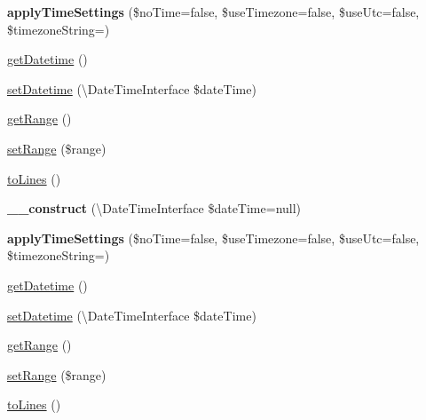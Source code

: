 \begin{DoxyCompactItemize}
{\bfseries apply\+Time\+Settings} (\$no\+Time=false, \$use\+Timezone=false, \$use\+Utc=false, \$timezone\+String=\textquotesingle{}\textquotesingle{})
\item 
\mbox{\hyperlink{class_eluceo_1_1i_cal_1_1_property_1_1_event_1_1_recurrence_id_a343360d2494fc6886739593da7867873}{get\+Datetime}} ()
\item 
\mbox{\hyperlink{class_eluceo_1_1i_cal_1_1_property_1_1_event_1_1_recurrence_id_a348cc32d3b8f03cac585f6eb19ee930f}{set\+Datetime}} (\textbackslash{}Date\+Time\+Interface \$date\+Time)
\item 
\mbox{\hyperlink{class_eluceo_1_1i_cal_1_1_property_1_1_event_1_1_recurrence_id_a7f52a0dbb43dcf28fd95a2b1ad386838}{get\+Range}} ()
\item 
\mbox{\hyperlink{class_eluceo_1_1i_cal_1_1_property_1_1_event_1_1_recurrence_id_ae005792e47bec89df30f5db6cb6ab63c}{set\+Range}} (\$range)
\item 
\mbox{\hyperlink{class_eluceo_1_1i_cal_1_1_property_1_1_event_1_1_recurrence_id_ad7bfce37171e9017a413052603b30ca4}{to\+Lines}} ()
\item 
\mbox{\label{class_eluceo_1_1i_cal_1_1_property_1_1_event_1_1_recurrence_id_a30335a89e4b7cdbb5be84a73340542c3}} 
{\bfseries \+\_\+\+\_\+construct} (\textbackslash{}Date\+Time\+Interface \$date\+Time=null)
\item 
\mbox{\label{class_eluceo_1_1i_cal_1_1_property_1_1_event_1_1_recurrence_id_a7c8a81a7760136bce2ff1b93e2b4d541}} 
{\bfseries apply\+Time\+Settings} (\$no\+Time=false, \$use\+Timezone=false, \$use\+Utc=false, \$timezone\+String=\textquotesingle{}\textquotesingle{})
\item 
\mbox{\hyperlink{class_eluceo_1_1i_cal_1_1_property_1_1_event_1_1_recurrence_id_a343360d2494fc6886739593da7867873}{get\+Datetime}} ()
\item 
\mbox{\hyperlink{class_eluceo_1_1i_cal_1_1_property_1_1_event_1_1_recurrence_id_a348cc32d3b8f03cac585f6eb19ee930f}{set\+Datetime}} (\textbackslash{}Date\+Time\+Interface \$date\+Time)
\item 
\mbox{\hyperlink{class_eluceo_1_1i_cal_1_1_property_1_1_event_1_1_recurrence_id_a7f52a0dbb43dcf28fd95a2b1ad386838}{get\+Range}} ()
\item 
\mbox{\hyperlink{class_eluceo_1_1i_cal_1_1_property_1_1_event_1_1_recurrence_id_ae005792e47bec89df30f5db6cb6ab63c}{set\+Range}} (\$range)
\item 
\mbox{\hyperlink{class_eluceo_1_1i_cal_1_1_property_1_1_event_1_1_recurrence_id_ad7bfce37171e9017a413052603b30ca4}{to\+Lines}} ()
\end{DoxyCompactItemize}
